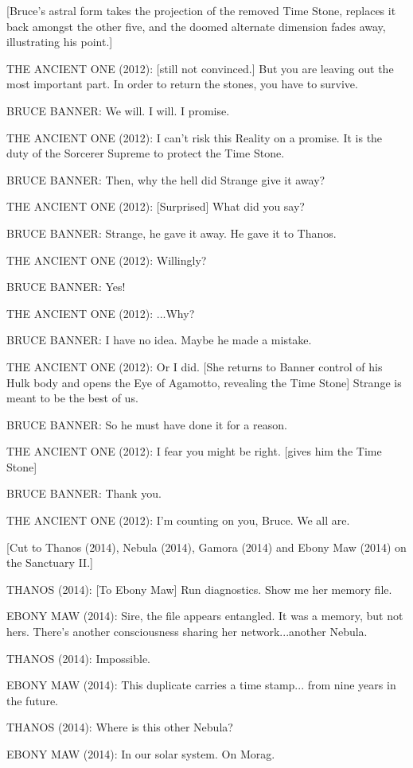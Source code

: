 [Bruce's astral form takes the projection of the removed Time Stone, replaces it back amongst the other five, and the doomed alternate dimension fades away, illustrating his point.]

THE ANCIENT ONE (2012): [still not convinced.] But you are leaving out the most important part. In order to return the stones, you have to survive.

BRUCE BANNER: We will. I will. I promise.

THE ANCIENT ONE (2012): I can't risk this Reality on a promise. It is the duty of the Sorcerer Supreme to protect the Time Stone.

BRUCE BANNER: Then, why the hell did Strange give it away?

THE ANCIENT ONE (2012): [Surprised] What did you say?

BRUCE BANNER: Strange, he gave it away. He gave it to Thanos.

THE ANCIENT ONE (2012): Willingly?

BRUCE BANNER: Yes!

THE ANCIENT ONE (2012): ...Why?

BRUCE BANNER: I have no idea. Maybe he made a mistake.

THE ANCIENT ONE (2012): Or I did. [She returns to Banner control of his Hulk body and opens the Eye of Agamotto, revealing the Time Stone] Strange is meant to be the best of us.

BRUCE BANNER: So he must have done it for a reason.

THE ANCIENT ONE (2012): I fear you might be right. [gives him the Time Stone]

BRUCE BANNER: Thank you.

THE ANCIENT ONE (2012): I'm counting on you, Bruce. We all are.

[Cut to Thanos (2014), Nebula (2014), Gamora (2014) and Ebony Maw (2014) on the Sanctuary II.]

THANOS (2014): [To Ebony Maw] Run diagnostics. Show me her memory file.

EBONY MAW (2014): Sire, the file appears entangled. It was a memory, but not hers. There's another consciousness sharing her network...another Nebula.

THANOS (2014): Impossible.

EBONY MAW (2014): This duplicate carries a time stamp... from nine years in the future.

THANOS (2014): Where is this other Nebula?

EBONY MAW (2014): In our solar system. On Morag.

